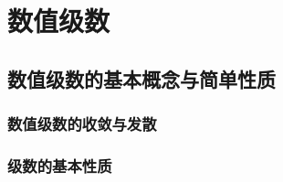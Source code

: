 

\chapter{数值级数}\label{ch:11}

\section{数值级数的基本概念与简单性质}
\subsection{数值级数的收敛与发散}
\subsection{级数的基本性质}
